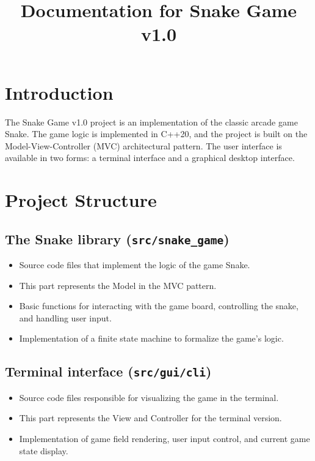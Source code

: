 \documentclass{article}
\begin{document}
\title{Documentation for Snake Game v1.0}
\date{}
\maketitle

\section{Introduction}

The Snake Game v1.0 project is an implementation of the classic arcade game Snake. The game logic is implemented in C++20, and the project is built on the Model-View-Controller (MVC) architectural pattern. The user interface is available in two forms: a terminal interface and a graphical desktop interface.

\section{Project Structure}

\subsection{The Snake library (\texttt{src/snake\_game})}

\begin{itemize}[label=--]
    \item Source code files that implement the logic of the game Snake.
    \item This part represents the Model in the MVC pattern.
    \item Basic functions for interacting with the game board, controlling the snake, and handling user input.
    \item Implementation of a finite state machine to formalize the game's logic.
\end{itemize}

\subsection{Terminal interface (\texttt{src/gui/cli})}

\begin{itemize}[label=--]
    \item Source code files responsible for visualizing the game in the terminal.
    \item This part represents the View and Controller for the terminal version.
    \item Implementation of game field rendering, user input control, and current game state display.
\end{itemize}
\end{document}
